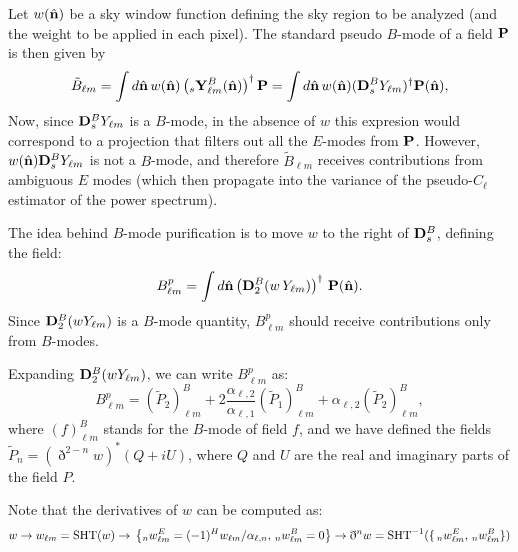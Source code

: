 \documentclass[a4paper,10pt]{article}
\newcommand{\nv}{\hat{\bf n}}
\begin{document}
  Let $w(\nv)$ be a sky window function defining the sky region to be analyzed (and the weight to be applied in each pixel). The standard pseudo $B$-mode of a field ${\bf P}$ is then given by
  \begin{equation}
    \tilde{B}_{\ell m}=\int d\nv\,w(\nv)\left(_s{\bf Y}^{B}_{\ell m}(\nv)\right)^\dag{\bf P}=\int d\nv\,w(\nv)({\bf D}^B_sY_{\ell m})^\dag{\bf P}(\nv),
  \end{equation}
  Now, since ${\bf D}^B_sY_{\ell m}$ is a $B$-mode, in the absence of $w$ this expresion would correspond to a projection that filters out all the $E$-modes from ${\bf P}$. However, $w(\nv){\bf D}^B_sY_{\ell m}$ is not a $B$-mode, and therefore $\tilde{B}_{\ell m}$ receives contributions from ambiguous $E$ modes (which then propagate into the variance of the pseudo-$C_\ell$ estimator of the power spectrum).
  
  The idea behind $B$-mode purification is to move $w$ to the right of ${\bf D}^B_s$, defining the field:
  \begin{equation}
   B^p_{\ell m}=\int d\nv\left({\bf D}^B_2(w\,Y_{\ell m})\right)^\dag\,{\bf P}(\nv).
  \end{equation}
  Since ${\bf D}^B_2(wY_{\ell m})$ is a $B$-mode quantity, $B^p_{\ell m}$ should receive contributions only from $B$-modes.
  
  Expanding ${\bf D}^B_2(wY_{\ell m})$, we can write $B^p_{\ell m}$ as:
  \begin{equation}
    B^p_{\ell m}=
    \left(\tilde{P}_2\right)^B_{\ell m}+
    2\frac{\alpha_{\ell,2}}{\alpha_{\ell,1}}\left(\tilde{P}_1\right)^B_{\ell m}+\alpha_{\ell,2}\left(\tilde{P}_2\right)^B_{\ell m},
  \end{equation}
  where $(f)^B_{\ell m}$ stands for the $B$-mode of field $f$, and we have defined the fields $\tilde{P}_n=(\eth^{2-n}w)^*(Q+iU)$, where $Q$ and $U$ are the real and imaginary parts of the field $P$.
  
  Note that the derivatives of $w$ can be computed as:
  \begin{equation}
    w
    \rightarrow w_{\ell m}={\rm SHT}(w)
    \rightarrow\,\left\{_nw^E_{\ell m}=(-1)^Hw_{\ell m}/\alpha_{\ell,n},\,_nw^B_{\ell m}=0\right\}
    \rightarrow \eth^nw={\rm SHT}^{-1}(\{\,_nw^E_{\ell m},\,_nw^B_{\ell m}\})
  \end{equation}
\end{document}
